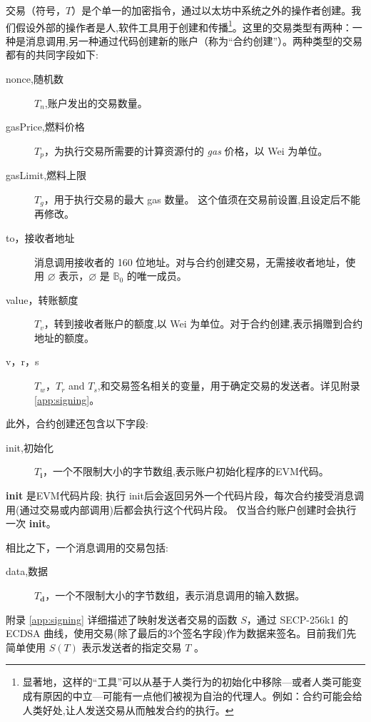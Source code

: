 \documentclass[9pt,oneside]{amsart}
\begin{document}
\begin{multicols}{2}
交易（符号，$T$）是个单一的加密指令，通过以太坊中系统之外的操作者创建。我们假设外部的操作者是人,软件工具用于创建和传播\footnote{显著地，这样的“工具”可以从基于人类行为的初始化中移除---或者人类可能变成有原因的中立---可能有一点他们被视为自治的代理人。例如：合约可能会给人类好处,让人发送交易从而触发合约的执行。}。这里的交易类型有两种：一种是消息调用,另一种通过代码创建新的账户（称为“合约创建”）。两种类型的交易都有的共同字段如下:

\begin{description}
\item[nonce,随机数] $T_n$,账户发出的交易数量。
\item[gasPrice,燃料价格] $T_p$，为执行交易所需要的计算资源付的 \textit{gas} 价格，以 Wei 为单位。
\item[gasLimit,燃料上限] $T_g$，用于执行交易的最大 gas 数量。 这个值须在交易前设置,且设定后不能再修改。
\item[to，接收者地址] 消息调用接收者的 160 位地址。对与合约创建交易，无需接收者地址，使用 $\varnothing$ 表示，$\varnothing$ 是 $\mathbb{B}_0$ 的唯一成员。
\item[value，转账额度] $T_v$，转到接收者账户的额度,以 Wei 为单位。对于合约创建,表示捐赠到合约地址的额度。
\item[v，r，s] $T_w$，$T_r$ and $T_s$,和交易签名相关的变量，用于确定交易的发送者。详见附录 \ref{app:signing}。
\end{description}

此外，合约创建还包含以下字段:

\begin{description}
\item[init,初始化] $T_\mathbf{i}$，一个不限制大小的字节数组,表示账户初始化程序的EVM代码。
\end{description}

\textbf{init} 是EVM代码片段; 执行 init后会返回另外一个代码片段，每次合约接受消息调用(通过交易或内部调用)后都会执行这个代码片段。 仅当合约账户创建时会执行一次 \textbf{init}。

相比之下，一个消息调用的交易包括:

\begin{description}
\item[data,数据] $T_\mathbf{d}$，一个不限制大小的字节数组，表示消息调用的输入数据。
\end{description}

附录 \ref{app:signing} 详细描述了映射发送者交易的函数 $S$，通过 SECP-256k1 的 ECDSA 曲线，使用交易(除了最后的3个签名字段)作为数据来签名。目前我们先简单使用 $S(T)$ 表示发送者的指定交易 $T$ 。


\end{multicols}
\end{document}
